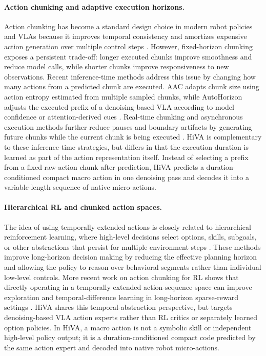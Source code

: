 \documentclass[10pt,twocolumn,letterpaper]{article}
\begin{document}
\paragraph{Action chunking and adaptive execution horizons.}
Action chunking has become a standard design choice in modern robot policies and VLAs because it improves temporal consistency and amortizes expensive action generation over multiple control steps \cite{act2023,diffusionpolicy2023,smolvla2025,vpp2024}. However, fixed-horizon chunking exposes a persistent trade-off: longer executed chunks improve smoothness and reduce model calls, while shorter chunks improve responsiveness to new observations. Recent inference-time methods address this issue by changing how many actions from a predicted chunk are executed. AAC adapts chunk size using action entropy estimated from multiple sampled chunks, while AutoHorizon adjusts the executed prefix of a denoising-based VLA according to model confidence or attention-derived cues \cite{aac2026,autohorizon2026}. Real-time chunking and asynchronous execution methods further reduce pauses and boundary artifacts by generating future chunks while the current chunk is being executed \cite{rtc2025,abpolicy2026}. HiVA is complementary to these inference-time strategies, but differs in that the execution duration is learned as part of the action representation itself. Instead of selecting a prefix from a fixed raw-action chunk after prediction, HiVA predicts a duration-conditioned compact macro action in one denoising pass and decodes it into a variable-length sequence of native micro-actions.

\paragraph{Hierarchical RL and chunked action spaces.}
The idea of using temporally extended actions is closely related to hierarchical reinforcement learning, where high-level decisions select options, skills, subgoals, or other abstractions that persist for multiple environment steps \cite{options1999,hiro2018,hac2019}. These methods improve long-horizon decision making by reducing the effective planning horizon and allowing the policy to reason over behavioral segments rather than individual low-level controls. More recent work on action chunking for RL shows that directly operating in a temporally extended action-sequence space can improve exploration and temporal-difference learning in long-horizon sparse-reward settings \cite{qchunking2025}. HiVA shares this temporal-abstraction perspective, but targets denoising-based VLA action experts rather than RL critics or separately learned option policies. In HiVA, a macro action is not a symbolic skill or independent high-level policy output; it is a duration-conditioned compact code predicted by the same action expert and decoded into native robot micro-actions.
\end{document}
